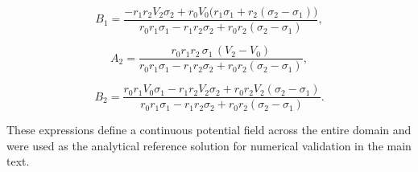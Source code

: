 \[
B_1 =
\frac{
- r_1 r_2 V_2 \sigma_2
+ r_0 V_0 \big( r_1 \sigma_1 + r_2 (\sigma_2 - \sigma_1) \big)
}{
r_0 r_1 \sigma_1 - r_1 r_2 \sigma_2 + r_0 r_2 (\sigma_2 - \sigma_1)
},
\]

\[
A_2 =
\frac{
r_0 r_1 r_2 \, \sigma_1 \, (V_2 - V_0)
}{
r_0 r_1 \sigma_1 - r_1 r_2 \sigma_2 + r_0 r_2 (\sigma_2 - \sigma_1)
},
\]

\[
B_2 =
\frac{
r_0 r_1 V_0 \sigma_1
- r_1 r_2 V_2 \sigma_2
+ r_0 r_2 V_2 (\sigma_2 - \sigma_1)
}{
r_0 r_1 \sigma_1 - r_1 r_2 \sigma_2 + r_0 r_2 (\sigma_2 - \sigma_1)
}.
\]


These expressions define a continuous potential field across the entire domain and were
used as the analytical reference solution for numerical validation in the main text.

